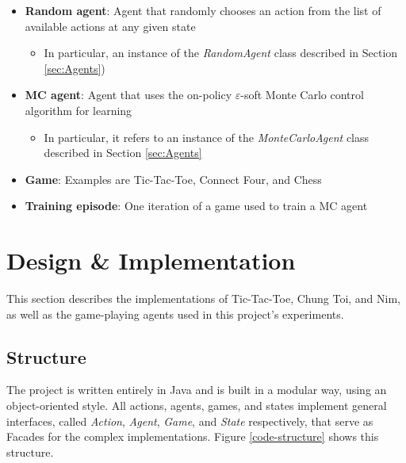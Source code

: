 \documentclass[11pt,a4paper]{report}
\begin{document}
\begin{itemize}

	\item \textbf{Random agent}: Agent that randomly chooses an action from the list of available actions at any given state
		\begin{itemize}
			\item In particular, an instance of the \emph{RandomAgent} class described in Section \ref{sec:Agents})
		\end{itemize}

	\item \textbf{MC agent}: Agent that uses the on-policy $\varepsilon$-soft Monte Carlo control algorithm for learning
		\begin{itemize}
			\item In particular, it refers to an instance of the \emph{MonteCarloAgent} class described in Section \ref{sec:Agents}
		\end{itemize}

	\item \textbf{Game}: Examples are Tic-Tac-Toe, Connect Four, and Chess

	\item \textbf{Training episode}: One iteration of a game used to train a MC agent

\end{itemize}


\chapter{Design \& Implementation}

This section describes the implementations of Tic-Tac-Toe, Chung Toi, and Nim, as well as the game-playing agents used in this project's experiments.


\section{Structure}

The project is written entirely in Java and is built in a modular way, using an object-oriented style. All actions, agents, games, and states implement general interfaces, called \emph{Action}, \emph{Agent}, \emph{Game}, and \emph{State} respectively, that serve as Facades for the complex implementations. Figure \ref{code-structure} shows this structure.
\end{document}
